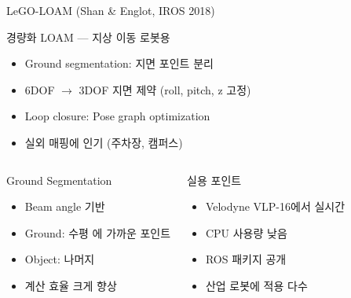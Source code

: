 \begin{frame}{LeGO-LOAM (Shan \& Englot, IROS 2018)}
  \begin{block}{경량화 LOAM — 지상 이동 로봇용}
    \begin{itemize}
      \item Ground segmentation: 지면 포인트 분리
      \item 6DOF $\to$ 3DOF 지면 제약 (roll, pitch, z 고정)
      \item Loop closure: Pose graph optimization
      \item 실외 매핑에 인기 (주차장, 캠퍼스)
    \end{itemize}
  \end{block}
  \pause
  \begin{columns}
    \begin{block}{Ground Segmentation}
      \begin{itemize}
        \item Beam angle 기반
        \item Ground: 수평 에 가까운 포인트
        \item Object: 나머지
        \item 계산 효율 크게 향상
      \end{itemize}
    \end{block}
    \begin{exampleblock}{실용 포인트}
      \begin{itemize}
        \item Velodyne VLP-16에서 실시간
        \item CPU 사용량 낮음
        \item ROS 패키지 공개
        \item 산업 로봇에 적용 다수
      \end{itemize}
    \end{exampleblock}
  \end{columns}
\end{frame}

